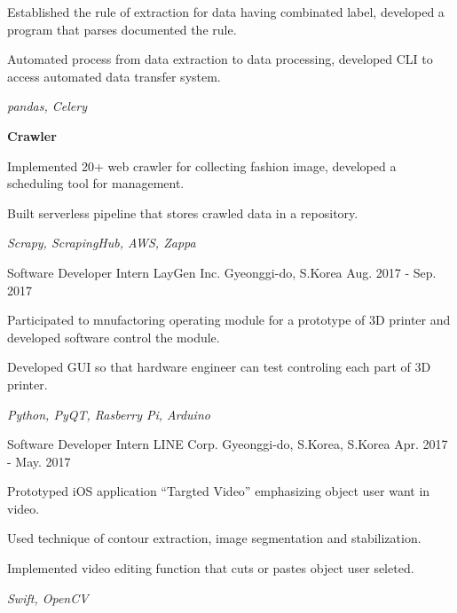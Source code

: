 \begin{cventries}
{\begin{cvitems}
        \item {Established the rule of extraction for data having combinated label, developed a program that parses documented the rule.}
        \item {Automated process from data extraction to data processing, developed CLI to access automated data transfer system.}
        \item \textit{pandas, Celery}
        \item[] {\textbf{Crawler}}
        \item {Implemented 20+ web crawler for collecting fashion image, developed a scheduling tool for management.} 
        \item {Built serverless pipeline that stores crawled data in a repository.}
        \item \textit{Scrapy, ScrapingHub, AWS, Zappa}
      \end{cvitems}
    }

  \cventry
    {Software Developer Intern} %
    {LayGen Inc.} %
    {Gyeonggi-do, S.Korea} %
    {Aug. 2017 - Sep. 2017} %
    {
      \begin{cvitems} %
        \item {Participated to mnufactoring operating module for a prototype of 3D printer and developed software control the module.}
        \item {Developed GUI so that hardware engineer can test controling each part of 3D printer.}
        \item \textit{Python, PyQT, Rasberry Pi, Arduino}
      \end{cvitems}
    }

  \cventry
    {Software Developer Intern} %
    {LINE Corp.} %
    {Gyeonggi-do, S.Korea, S.Korea} %
    {Apr. 2017 - May. 2017} %
    {
      \begin{cvitems} %
        \item {Prototyped iOS application ``Targted Video'' emphasizing object user want in video.}
        \item {Used technique of contour extraction, image segmentation and stabilization.}
        \item {Implemented video editing function that cuts or pastes object user seleted.}
        \item \textit{Swift, OpenCV}
      \end{cvitems}
    }


\end{cventries}
